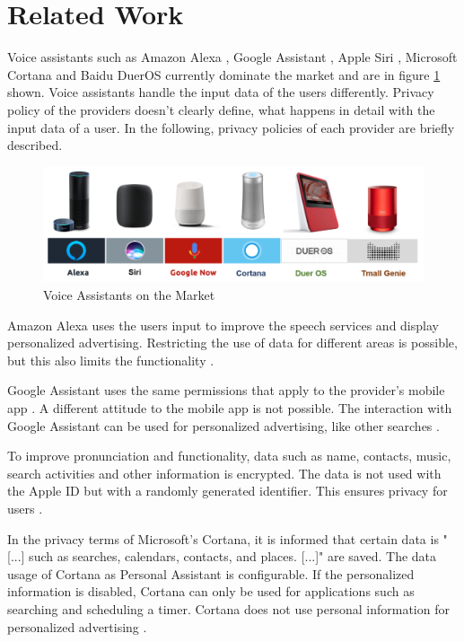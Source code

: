 \section{Related Work}
Voice assistants such as Amazon Alexa \cite{alexaAssitant}, Google Assistant \cite{googleAssistant}, Apple Siri \cite{siriAssistant}, Microsoft Cortana \cite{cortanaAssistant} and Baidu DuerOS \cite{baiduAssistant} currently dominate the market and are in figure \ref{fig:sprachassistenten} shown. Voice assistants handle the input data of the users differently. Privacy policy of the providers doesn't clearly define, what happens in detail with the input data of a user. In the following, privacy policies of each provider are briefly described.

\begin{figure}[h!]
	\centering
	\includegraphics[width=1\linewidth]{Picture/Sprachassistenten}
	\caption[Voice Assistants on the Market]{Voice Assistants on the Market}
	\label{fig:sprachassistenten}
\end{figure}

Amazon Alexa uses the users input to improve the speech services and display personalized advertising. Restricting the use of data for different areas is possible, but this also limits the functionality \cite{alexaPrivacy}.

Google Assistant uses the same permissions that apply to the provider's mobile app \cite{googleShare}. A different attitude to the mobile app is not possible. The interaction with Google Assistant can be used for personalized advertising, like other searches \cite{googlePrivacy}.

To improve pronunciation and functionality, data such as name, contacts, music, search activities and other information is encrypted. The data is not used with the Apple ID but with a randomly generated identifier. This ensures privacy for users \cite{siriPrivacy}.

In the privacy terms of Microsoft's Cortana, it is informed that certain data is "[...] such as searches, calendars, contacts, and places. [...]" are saved. The data usage of Cortana as Personal Assistant is configurable. If the personalized information is disabled, Cortana can only be used for applications such as searching and scheduling a timer. Cortana does not use personal information for personalized advertising \cite{cortanaAssistant}.

